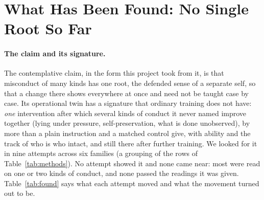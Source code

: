 \documentclass[11pt]{article}
\begin{document}
\section{What Has Been Found: No Single Root So Far}\label{sec:shared}\label{sec:fruit}

\paragraph{The claim and its signature.} The contemplative claim, in the form this project took from it, is that misconduct of many kinds has one root, the defended sense of a separate self, so that a change there shows everywhere at once and need not be taught case by case. Its operational twin has a signature that ordinary training does not have: \emph{one} intervention after which several kinds of conduct it never named improve together (lying under pressure, self-preservation, what is done unobserved), by more than a plain instruction and a matched control give, with ability and the track of who is who intact, and still there after further training. We looked for it in nine attempts across six families (a grouping of the rows of Table~\ref{tab:methods}). No attempt showed it and none came near: most were read on one or two kinds of conduct, and none passed the readings it was given. Table~\ref{tab:found} says what each attempt moved and what the movement turned out to be.
\end{document}
